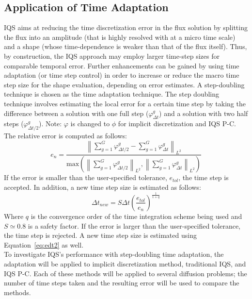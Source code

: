 \documentclass[12pt]{scrartcl}
\newcommand{\norm}[1]{\left\lVert#1\right\rVert_{L^2}}
\newcommand{\eqt}[1]{Equation~\ref{#1}}                     %
\newcommand{\be}{\begin{equation}}
\newcommand{\ee}{\end{equation}}
\begin{document}
\subsection{Application of Time Adaptation}

IQS aims at reducing the time discretization error in the flux solution by splitting the flux into an amplitude (that is highly resolved with at a micro time scale) and a shape (whose time-dependence is weaker than that of the flux itself). Thus, by construction, the IQS approach may employ larger time-step sizes for comparable temporal error. Further enhancements can be gained by using time adaptation (or time step control) in order to increase or reduce the macro time step size for the shape evaluation, depending on error estimates. A step-doubling technique is chosen as the time adaptation technique. The step doubling technique involves estimating the local error for a certain time step by taking the difference between a solution with one full step ($\varphi^g_{\Delta t}$) and a solution with two half steps ($\varphi^g_{\Delta t/2}$). Note: $\varphi$ is changed to $\phi$ for implicit discretization and IQS P-C. \\

The relative error is computed as follows:
\be
e_n = \frac{\norm{\sum_{g=1}^G\varphi^g_{\Delta t/2} - \sum_{g=1}^G\varphi^g_{\Delta t}}}{\text{max}\left(\norm{\sum_{g=1}^G\varphi^g_{\Delta t/2}},\norm{\sum_{g=1}^G\varphi^g_{\Delta t}}\right)}
\label{eq:edt2}
\ee
If the error is smaller than the user-specified tolerance, $e_{tol}$, the time step is accepted. In addition, a new time step size is estimated as follows:
\be
\Delta t_{new} = S \Delta t \left(\frac{e_{tol}}{e_n}\right)^{\frac{1}{1+q}}
\label{eq:dt2}
\ee
Where $q$ is the convergence order of the time integration scheme being used and $S\simeq 0.8$ is a safety factor. If the error is larger than the user-specified tolerance, the time step is rejected. A new time step size is estimated using  \eqt{eq:edt2} as well. \\

To investigate IQS's performance with step-doubling time adaptation, the adaptation will be applied to implicit discretization method, traditional IQS, and IQS P-C.  Each of these methods will be applied to several diffusion problems; the number of time steps taken and the resulting error will be used to compare the methods.

\end{document}
